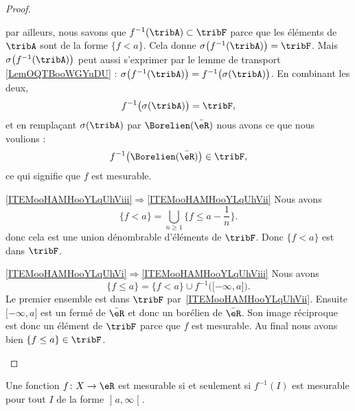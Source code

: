 \begin{proof}
\begin{subproof}
        par ailleurs, nous savons que \( f^{-1}(\tribA)\subset\tribF\) parce que les éléments de \( \tribA\) sont de la forme \( \{ f<a \}\). Cela donne \( \sigma\big( f^{-1}(\tribA) \big)=\tribF\). Mais \( \sigma\big( f^{-1}(\tribA) \big)\) peut aussi s'exprimer par le lemme de transport \ref{LemOQTBooWGYuDU} : \( \sigma\big( f^{-1}(\tribA) \big)=f^{-1}\big( \sigma(\tribA) \big)\). En combinant les deux,
        \begin{equation}
            f^{-1}\big( \sigma(\tribA) \big)=\tribF,
        \end{equation}
        et en remplaçant \( \sigma(\tribA)\) par \( \Borelien(\bar \eR)\) nous avons ce que nous voulions :
        \begin{equation}
            f^{-1}\big( \Borelien(\bar\eR) \big)\in\tribF,
        \end{equation}
        ce qui signifie que \( f\) est mesurable.
        \item[\ref{ITEMooHAMHooYLqUhViii}\( \Rightarrow\)\ref{ITEMooHAMHooYLqUhVii}]
            Nous avons
            \begin{equation}
                \{ f<a \}=\bigcup_{n\geq 1}\{ f\leq a-\frac{1}{ n } \}.
            \end{equation}
            donc cela est une union dénombrable d'éléments de \( \tribF\). Donc \( \{ f<a \}\) est dans \( \tribF\).
        \item[\ref{ITEMooHAMHooYLqUhVi}\( \Rightarrow\)\ref{ITEMooHAMHooYLqUhViii}]
            Nous avons
            \begin{equation}
                \{ f\leq a \}=\{ f<a \}\cup f^{-1}\big( \mathopen[ -\infty , a \mathclose] \big).
            \end{equation}
            Le premier ensemble est dans \( \tribF\) par~\ref{ITEMooHAMHooYLqUhVii}. Ensuite \( \mathopen[ -\infty , a \mathclose]\) est un fermé de \( \bar \eR\) et donc un borélien de \( \bar \eR\). Son image réciproque est donc un élément de \( \tribF\) parce que \( f\) est mesurable. Au final nous avons bien \( \{ f\leq a \}\in\tribF\).
    \end{subproof}
\end{proof}

\begin{lemma}   \label{LemFOlheqw}
    Une fonction \( f\colon X\to \eR\) est mesurable si et seulement si \( f^{-1}(I)\) est mesurable pour tout \( I\) de la forme \( \mathopen] a , \infty \mathclose[\).
\end{lemma}

